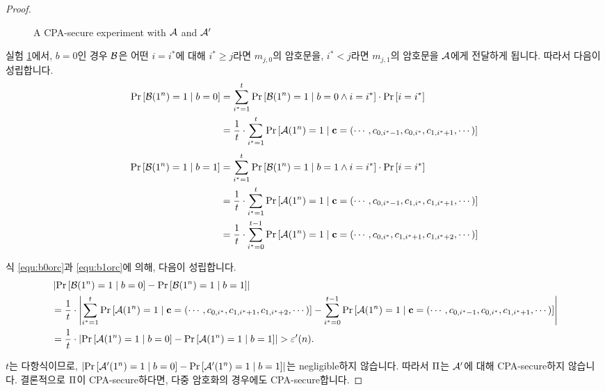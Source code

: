 \begin{proof}
\begin{figure}[h]
    \caption{A CPA-secure experiment with $\mathcal{A}$ and $\mathcal{A}'$}
    \label{fig:cpa_to_lr_cpa}
  \end{figure}

  실험 \ref{fig:cpa_to_lr_cpa}에서, $b = 0$인 경우 $\mathcal{B}$은 어떤 $i = i^*$에 대해 
  $i^* \ge j$라면 $m_{j, 0}$의 암호문을, $i^* < j$라면 $m_{j, 1}$의 암호문을 $\mathcal{A}$에게 
  전달하게 됩니다. 따라서 다음이 성립합니다.
  \begin{equation}
    \begin{split}
      \text{Pr} \left[ \mathcal{B}(1^n) = 1 \;|\; b = 0 \right] 
      &= \sum_{i^* = 1}^t \text{Pr} \left[ \mathcal{B}(1^n) = 1 \;|\; b = 0 \wedge i = i^* \right]
      \cdot \text{Pr} \left[ i = i^* \right] \\
      &= \frac{1}{t} \cdot \sum_{i^* = 1}^t \text{Pr} \left[ \mathcal{A}(1^n) = 1 \;|\; \mathbf{c} 
      = (\cdots, c_{0, i^* - 1}, c_{0, i^*}, c_{1, i^* + 1}, \cdots) \right]
      \label{equ:b0orc}
    \end{split}
  \end{equation}
  \begin{equation}
    \begin{split}
      \text{Pr} \left[ \mathcal{B}(1^n) = 1 \;|\; b = 1 \right] 
      &= \sum_{i^* = 1}^t \text{Pr} \left[ \mathcal{B}(1^n) = 1 \;|\; b = 1 \wedge i = i^* \right] 
      \cdot \text{Pr} \left[ i = i^* \right] \\
      &= \frac{1}{t} \cdot \sum_{i^* = 1}^t \text{Pr} \left[ \mathcal{A}(1^n) = 1 \;|\; \mathbf{c} 
      = (\cdots, c_{0, i^* - 1}, c_{1, i^*}, c_{1, i^* + 1}, \cdots) \right] \\
      &= \frac{1}{t} \cdot \sum_{i^* = 0}^{t - 1} 
      \text{Pr} \left[ \mathcal{A}(1^n) = 1 \;|\; \mathbf{c} 
      = (\cdots, c_{0, i^*}, c_{1, i^* + 1}, c_{1, i^* + 2}, \cdots) \right] \\
      \label{equ:b1orc}
    \end{split}
  \end{equation}

  식 \ref{equ:b0orc}과 \ref{equ:b1orc}에 의해, 다음이 성립합니다.
  \begin{equation}
    \begin{split}
      & \left| 
        \text{Pr} \left[ \mathcal{B}(1^n) = 1 \;|\; b = 0 \right] - \text{Pr} \left[ \mathcal{B}(1^n) = 1 \;|\; b = 1 \right]
       \right| \\
      &= \frac{1}{t} \cdot \left| 
        \sum_{i^* = 1}^t \text{Pr} \left[ \mathcal{A}(1^n) = 1 \;|\; \mathbf{c} 
        = (\cdots, c_{0, i^*}, c_{1, i^* + 1}, c_{1, i^* + 2}, \cdots) \right]
        - \sum_{i^* = 0}^{t-1} \text{Pr} \left[ \mathcal{A}(1^n) = 1 \;|\; \mathbf{c} 
        = (\cdots, c_{0, i^* - 1}, c_{0, i^*}, c_{1, i^* + 1}, \cdots) \right]
         \right| \\
      &= \frac{1}{t} \cdot \left| \text{Pr} \left[ \mathcal{A}(1^n) = 1 \;|\; b = 0 \right]
       - \text{Pr} \left[ \mathcal{A}(1^n) = 1 \;|\; b = 1 \right] \right| > \varepsilon'(n).
    \end{split}
  \end{equation}


  $t$는 다항식이므로, $\left| \text{Pr} \left[ \mathcal{A}'(1^n) = 1 \;|\; b = 0 \right] - \text{Pr} \left[ \mathcal{A}'(1^n) = 1 \;|\; b = 1 \right] \right|$는 negligible하지 않습니다. 따라서 $\Pi$는 $\mathcal{A}'$에 대해 CPA-secure하지 않습니다. 결론적으로 $\Pi$이 CPA-secure하다면, 다중 암호화의 경우에도 CPA-secure합니다.
\end{proof}